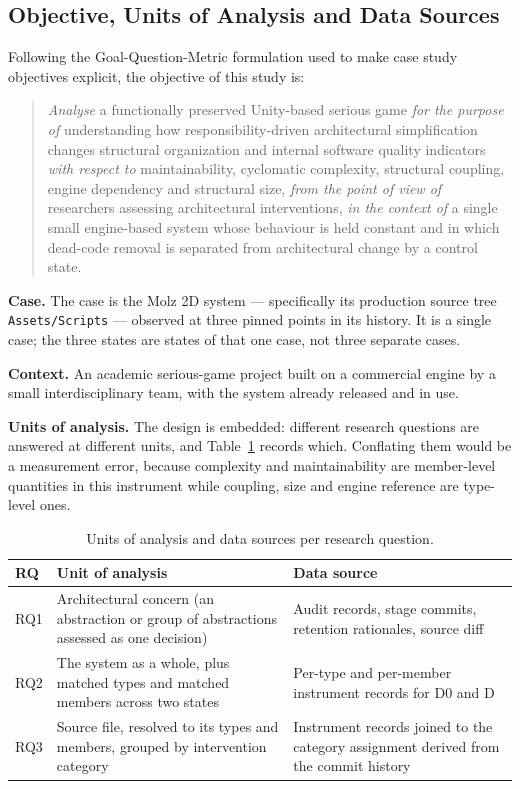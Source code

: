 \documentclass{sbc2019}%
\begin{document}
\subsection{Objective, Units of Analysis and Data Sources}

Following the Goal-Question-Metric formulation used to make case study objectives
explicit, the objective of this study is:

\begin{quote}
\emph{Analyse} a functionally preserved Unity-based serious game \emph{for the
purpose of} understanding how responsibility-driven architectural simplification
changes structural organization and internal software quality indicators
\emph{with respect to} maintainability, cyclomatic complexity, structural
coupling, engine dependency and structural size, \emph{from the point of view of}
researchers assessing architectural interventions, \emph{in the context of} a
single small engine-based system whose behaviour is held constant and in which
dead-code removal is separated from architectural change by a control state.
\end{quote}

\textbf{Case.} The case is the Molz 2D system --- specifically its production
source tree \texttt{Assets/Scripts} --- observed at three pinned points in its
history. It is a single case; the three states are states of that one case, not
three separate cases.

\textbf{Context.} An academic serious-game project built on a commercial engine
by a small interdisciplinary team, with the system already released and in use.

\textbf{Units of analysis.} The design is embedded: different research questions
are answered at different units, and Table~\ref{tab:units} records which.
Conflating them would be a measurement error, because complexity and
maintainability are member-level quantities in this instrument while coupling,
size and engine reference are type-level ones.

\begin{table}[htb]
\centering
\caption{Units of analysis and data sources per research question.}\label{tab:units}
\small
\begin{tabular}{p{}p{}p{}}
\toprule
\textbf{RQ} & \textbf{Unit of analysis} & \textbf{Data source} \\
\midrule
RQ1 & Architectural concern (an abstraction or group of abstractions assessed as
one decision) & Audit records, stage commits, retention rationales, source diff \\
\addlinespace
RQ2 & The system as a whole, plus matched types and matched members across two
states & Per-type and per-member instrument records for D0 and D \\
\addlinespace
RQ3 & Source file, resolved to its types and members, grouped by intervention
category & Instrument records joined to the category assignment derived from the
commit history \\
\bottomrule
\end{tabular}
\end{table}
\end{document}
